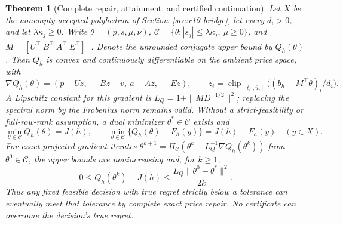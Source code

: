 \documentclass[11pt,letterpaper]{article}
\newtheorem{theorem}{Theorem}[section]
\theoremstyle{definition}
\newcommand{\1}{\mathbf 1}
\begin{document}
\begin{theorem}[Complete repair, attainment, and certified continuation]\label{thm:r22-complete}
Let $X$ be the nonempty accepted polyhedron of Section~\ref{sec:r19-bridge}, let every $d_i>0$, and let $\lambda\kappa_j\geq0$. Write $\theta=(p,s,\mu,\nu)$,
$\mathcal C=\{\theta:|s_j|\leq\lambda\kappa_j,\ \mu\geq0\}$,
and $M=[U^\top\ B^\top\ A^\top\ E^\top]^\top$.
Denote the unrounded conjugate upper bound by $Q_h(\theta)$. Then $Q_h$ is convex and continuously differentiable on the ambient price space, with
\begin{equation}\label{eq:r22-complete-gradient}
 \nabla Q_h(\theta)=(p-Uz,\ -Bz-v,\ a-Az,\ -Ez),\qquad
 z_i=\operatorname{clip}_{[\ell_i,\bar u_i]}\big((b_h-M^\top\theta)_i/d_i\big).
\end{equation}
A Lipschitz constant for this gradient is
$L_Q=1+\|MD^{-1/2}\|^2$; replacing the spectral norm by the Frobenius norm remains valid. Without a strict-feasibility or full-row-rank assumption, a dual minimizer $\theta^*\in\mathcal C$ exists and
\begin{equation}\label{eq:r22-exact-floor}
 \min_{\theta\in\mathcal C}Q_h(\theta)=J(h),\qquad
 \min_{\theta\in\mathcal C}\{Q_h(\theta)-F_h(y)\}=J(h)-F_h(y)
 \quad(y\in X).
\end{equation}
For exact projected-gradient iterates
$\theta^{k+1}=\Pi_{\mathcal C}(\theta^k-L_Q^{-1}\nabla Q_h(\theta^k))$
from $\theta^0\in\mathcal C$, the upper bounds are nonincreasing and, for $k\geq1$,
\begin{equation}\label{eq:r22-complete-rate}
 0\leq Q_h(\theta^k)-J(h)
 \leq \frac{L_Q\|\theta^0-\theta^*\|^2}{2k}.
\end{equation}
Thus any fixed feasible decision with true regret strictly below a tolerance can eventually meet that tolerance by complete exact price repair. No certificate can overcome the decision's true regret.
\end{theorem}
\end{document}
